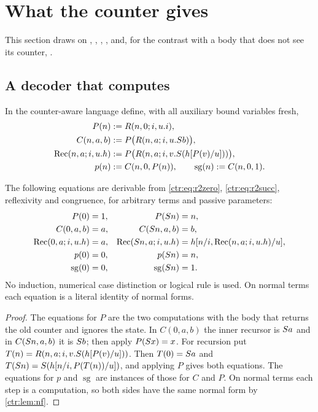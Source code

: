 \section{What the counter gives}\label{ctr:sec:counter}

This section draws on , ,
, ,  and, for the
contrast with a body that does not see its counter, .

\subsection{A decoder that computes}

In the counter-aware language define, with all auxiliary bound variables fresh,
\begin{equation}\label{ctr:eq:decoder}
\begin{aligned}
 P(n)&\mathrel{:=} R(n,0;i,u.i),\\
 C(n,a,b)&\mathrel{:=} P\bigl(R(n,a;i,u.S b)\bigr),\\
 \operatorname{Rec}(n,a;i,u.h)&\mathrel{:=}
   P\bigl(R(n,a;i,v.S(h[P(v)/u]))\bigr),\\
 p(n)&\mathrel{:=} C(n,0,P(n)),\qquad \operatorname{sg}(n)\mathrel{:=} C(n,0,1).
\end{aligned}
\end{equation}

\begin{lemma}\label{ctr:lem:decoder}
The following equations are derivable from \eqref{ctr:eq:r2zero}, \eqref{ctr:eq:r2succ},
reflexivity and congruence, for arbitrary terms and passive parameters:
\begin{align*}
 P(0)&=1, & P(S n)&=n,\\
 C(0,a,b)&=a, & C(S n,a,b)&=b,\\
 \operatorname{Rec}(0,a;i,u.h)&=a, &
 \operatorname{Rec}(S n,a;i,u.h)&=h[n/i,\operatorname{Rec}(n,a;i,u.h)/u],\\
 p(0)&=0, & p(S n)&=n,\\
 \operatorname{sg}(0)&=0, & \operatorname{sg}(S n)&=1.
\end{align*}
No induction, numerical case distinction or logical rule is used. On normal terms each
equation is a literal identity of normal forms.
\end{lemma}
\begin{proof}
The equations for $P$ are the two computations with the body that returns the old counter
and ignores the state. In $C(0,a,b)$ the inner recursor is $S a$ and in $C(S n,a,b)$ it
is $S b$; then apply $P(S x)=x$. For recursion put
$T(n)=R(n,a;i,v.S(h[P(v)/u]))$. Then $T(0)=S a$ and
$T(S n)=S(h[n/i,P(T(n))/u])$, and applying $P$ gives both equations. The equations for
$p$ and $\operatorname{sg}$ are instances of those for $C$ and $P$. On normal terms each
step is a computation, so both sides have the same normal form by \cref{ctr:lem:nf}.
\end{proof}

